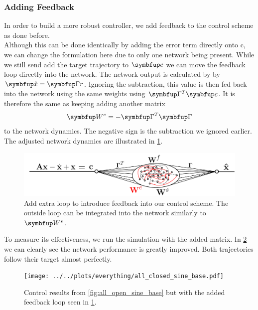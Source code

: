\subsubsection{Adding Feedback}
In order to build a more robust controller, we add feedback to the control scheme as done before.\\
Although this can be done identically by adding the error term directly onto c, we can change the formulation here due to only one network being present.
While we still send add the target trajectory to $\bmu{c}$ we can move the feedback loop directly into the network. The network output is calculated by by $\bmu{\hat{x}} = \bmu{\Gamma r}$. Ignoring the subtraction, this value is then fed back into the network using the same weights using $\bmu{\Gamma}^T\bmu{c}$. It is therefore the same as keeping adding another matrix
\begin{equation}
\bmu{W}^e = -\bmu{\Gamma}^T\bmu{\Gamma}
\end{equation}
to the network dynamics. The negative sign is the subtraction we ignored earlier. The adjusted network dynamics are illustrated in \cref{fig:schematic_feedback_control}.
\begin{figure}
	\centering
	\includegraphics[width=\textwidth]{svg-inkscape/schematic_closed_loop_controller.pdf}
	\caption{Add extra loop to introduce feedback into our control scheme. The outside loop can be integrated into the network similarly to $\bmu{W}^s$.}
	\label{fig:schematic_feedback_control}
\end{figure}
To measure its effectiveness, we run the simulation with the added matrix. In \cref{fig:all_closed_feedback_extra_loop} we can clearly see the network performance is greatly improved. Both trajectories follow their target almost perfectly.\\
\begin{figure}
	\centering
	\texttt{[image: ../../plots/everything/all\_closed\_sine\_base.pdf]}
	\caption{Control results from \cref{fig:all_open_sine_base} but with the added feedback loop seen in \cref{fig:schematic_feedback_control}.}
	\label{fig:all_closed_feedback_extra_loop}
\end{figure}


